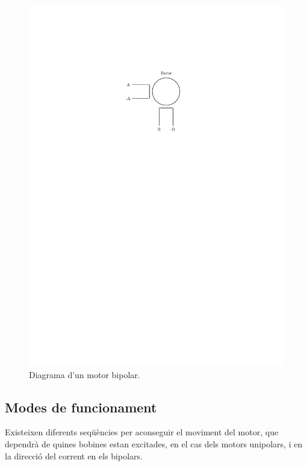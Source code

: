 \begin{itemize}
		\begin{figure}[H]
		\centering
		\includegraphics{Bipolar}
		\caption{Diagrama d'un motor bipolar.}
		\label{fig:biipolar}
	\end{figure}
\end{itemize}

\subsection{Modes de funcionament}
Existeixen diferents seqüències per aconseguir el moviment del motor, que dependrà de quines bobines estan excitades, en el cas dels motors unipolars, i en la direcció del corrent en els bipolars. 

